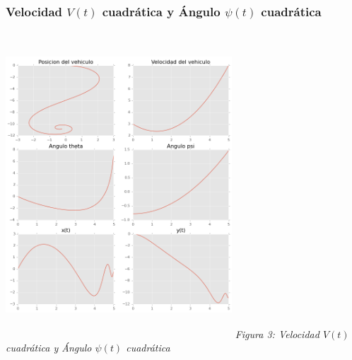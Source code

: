 \documentclass[twoside]{article}
\begin{document}
\begin{multicols}{2}
\subsubsection{Velocidad $V(t)$ cuadrática y Ángulo $\psi(t)$ cuadrática}
\begin{center}
 \includegraphics[width=240pt,height=325pt]{./v_quad_psi_quad.png}
  \textit{Figura 3: Velocidad $V(t)$ cuadrática y Ángulo $\psi(t)$ cuadrática}
\end{center}



\end{multicols}
\end{document}
